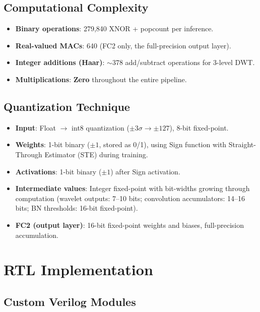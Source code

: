 \documentclass[conference]{IEEEtran}
\begin{document}
\subsection{Computational Complexity}

\begin{itemize}
    \item \textbf{Binary operations}: 279,840 XNOR + popcount per inference.
    \item \textbf{Real-valued MACs}: 640 (FC2 only, the full-precision output layer).
    \item \textbf{Integer additions (Haar)}: $\sim$378 add/subtract operations for 3-level DWT.
    \item \textbf{Multiplications}: \textbf{Zero} throughout the entire pipeline.
\end{itemize}

\subsection{Quantization Technique}

\begin{itemize}
    \item \textbf{Input}: Float $\rightarrow$ int8 quantization ($\pm3\sigma \rightarrow \pm127$), 8-bit fixed-point.
    \item \textbf{Weights}: 1-bit binary ($\pm1$, stored as 0/1), using Sign function with Straight-Through Estimator (STE) during training.
    \item \textbf{Activations}: 1-bit binary ($\pm1$) after Sign activation.
    \item \textbf{Intermediate values}: Integer fixed-point with bit-widths growing through computation (wavelet outputs: 7--10 bits; convolution accumulators: 14--16 bits; BN thresholds: 16-bit fixed-point).
    \item \textbf{FC2 (output layer)}: 16-bit fixed-point weights and biases, full-precision accumulation.
\end{itemize}

\section{RTL Implementation}

\subsection{Custom Verilog Modules}
\end{document}
